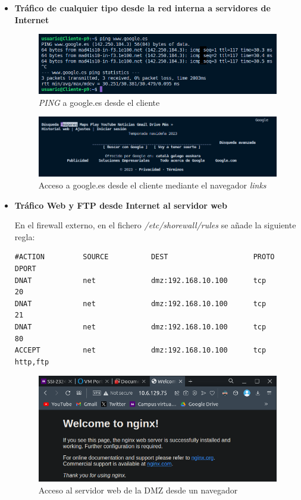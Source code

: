 \documentclass[11pt]{report}
\begin{document}
\begin{itemize}
  \cleardoublepage

  \item \textbf{Tráfico de cualquier tipo desde la red interna a servidores de Internet}
  \begin{figure}[H]
    \centering
    \includegraphics[scale=0.75]{img/internet_on_client.png}
    \caption{\emph{PING} a google.es desde el cliente}
  \end{figure}

  \begin{figure}[H]
    \centering
    \includegraphics[scale=0.6]{img/links_google.png}
    \caption{Acceso a google.es desde el cliente mediante el navegador \emph{links}}
  \end{figure}

  \cleardoublepage

  \item \textbf{Tráfico Web y FTP desde Internet al servidor web}
  
  En el firewall externo, en el fichero \emph{/etc/shorewall/rules} se añade la siguiente regla:
  \begin{verbatim}
#ACTION         SOURCE          DEST                    PROTO           DPORT
DNAT            net             dmz:192.168.10.100      tcp             20
DNAT            net             dmz:192.168.10.100      tcp             21
DNAT            net             dmz:192.168.10.100      tcp             80
ACCEPT          net             dmz:192.168.10.100      tcp             http,ftp
  \end{verbatim}

  \begin{figure}[H]
    \centering
    \includegraphics[scale=0.65]{img/nginx_navegador.png}
    \caption{Acceso al servidor web de la DMZ desde un navegador}
  \end{figure}


\end{itemize}
\end{document}
